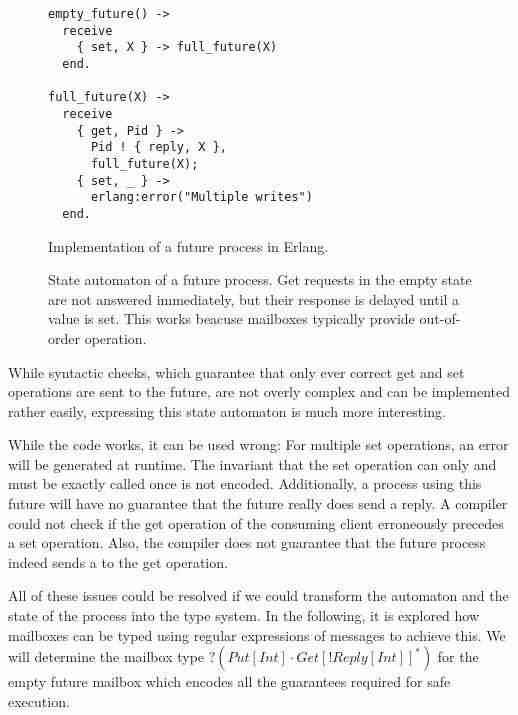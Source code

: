 \begin{figure}[ht]
\begin{minipage}[c]{0.48\linewidth}
    \begin{lstlisting}
empty_future() ->
  receive
    { set, X } -> full_future(X)
  end.

full_future(X) ->
  receive
    { get, Pid } ->
      Pid ! { reply, X },
      full_future(X);
    { set, _ } ->
      erlang:error("Multiple writes")
  end.
    \end{lstlisting}
    \caption{Implementation of a future process in Erlang\cite{fowlerSpecialDeliveryProgramming2023}.}
    \label{lst:futureErlang}
\end{minipage}
\hfill
\begin{minipage}[c]{0.48\linewidth}
    \caption{State automaton of a future process. Get requests in the empty state are not answered immediately, but their response is delayed until a value is set. This works beacuse mailboxes typically provide out-of-order operation.}
    \label{fig:futureStateAutomaton}
\end{minipage}
\end{figure}

While syntactic checks, which guarantee that only ever correct get and set operations are sent to the future, are not overly complex and can be implemented rather easily, expressing this state automaton is much more interesting. 

While the code works, it can be used wrong: For multiple set operations, an error will be generated at runtime. The invariant that the set operation can only and must be exactly called once is not encoded. Additionally, a process using this future will have no guarantee that the future really does send a reply. A compiler could not check if the get operation of the consuming client erroneously precedes a set operation. Also, the compiler does not guarantee that the future process indeed sends a to the get operation.

All of these issues could be resolved if we could transform the automaton and the state of the process into the type system. In the following, it is explored how mailboxes can be typed using regular expressions of messages to achieve this. We will determine the mailbox type $?(Put[Int] \cdot Get[!Reply[Int]]^*)$ for the empty future mailbox which encodes all the guarantees required for safe execution.

